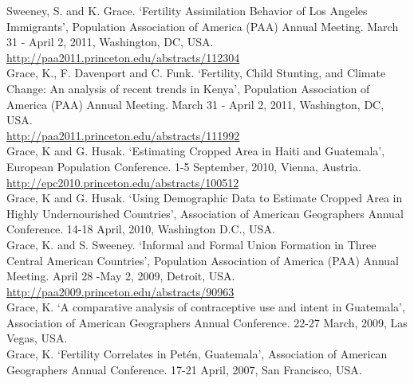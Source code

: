 \documentclass[11pt]{article} %
\begin{document}
\noindent
Sweeney, S. and K. Grace.  `Fertility Assimilation Behavior of Los Angeles Immigrants',
Population Association of America (PAA) Annual Meeting.  March 31 - April 2, 2011, Washington, DC, USA.\\
\url{http://paa2011.princeton.edu/abstracts/112304}\\

\noindent
Grace, K., F. Davenport and C. Funk.  `Fertility, Child Stunting, and Climate Change: An analysis of recent trends in Kenya',
Population Association of America (PAA) Annual Meeting.    March 31 - April 2, 2011, Washington, DC, USA.\\
\url{http://paa2011.princeton.edu/abstracts/111992}\\


\noindent
Grace, K and G. Husak. `Estimating Cropped Area in Haiti and Guatemala', European Population Conference. 1-5 September, 2010, Vienna, Austria.\\
\url{http://epc2010.princeton.edu/abstracts/100512}\\

\noindent
Grace, K and G. Husak. `Using Demographic Data to Estimate Cropped Area in Highly Undernourished Countries', Association of American Geographers Annual Conference. 14-18 April, 2010, Washington D.C., USA.\\

\noindent
Grace, K. and S. Sweeney.  `Informal and Formal Union Formation in Three Central American Countries',
Population Association of America (PAA) Annual Meeting.  April 28 -May 2, 2009, Detroit, USA.\\
\url{http://paa2009.princeton.edu/abstracts/90963}\\

\noindent
Grace, K. `A comparative analysis of contraceptive use and intent in Guatemala',
Association of American Geographers Annual Conference. 22-27 March, 2009, Las Vegas, USA.\\


\noindent
Grace, K.  `Fertility Correlates in Pet\'en, Guatemala',
Association of American Geographers Annual Conference. 17-21 April, 2007, San Francisco, USA.\\
\end{document}
